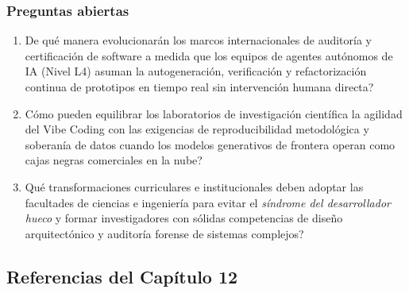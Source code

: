 \subsubsection*{Preguntas abiertas}
\begin{enumerate}[label=\arabic*., leftmargin=2em, itemsep=0.1cm, topsep=0.1cm, parsep=0pt]
    \item \textquestiondown De qué manera evolucionarán los marcos internacionales de auditoría y certificación de software a medida que los equipos de agentes autónomos de IA (Nivel L4) asuman la autogeneración, verificación y refactorización continua de prototipos en tiempo real sin intervención humana directa?
    \item \textquestiondown Cómo pueden equilibrar los laboratorios de investigación científica la agilidad del Vibe Coding con las exigencias de reproducibilidad metodológica y soberanía de datos cuando los modelos generativos de frontera operan como cajas negras comerciales en la nube?
    \item \textquestiondown Qué transformaciones curriculares e institucionales deben adoptar las facultades de ciencias e ingeniería para evitar el \textit{síndrome del desarrollador hueco} y formar investigadores con sólidas competencias de diseño arquitectónico y auditoría forense de sistemas complejos?
\end{enumerate}

\newpage
{}
\subsection*{Referencias del Capítulo 12}

